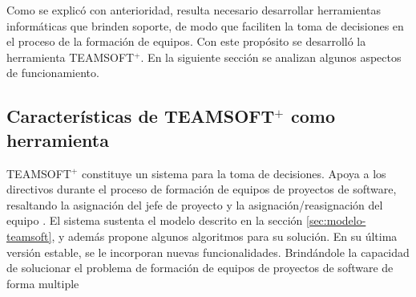 Como se explicó con anterioridad, resulta necesario desarrollar herramientas informáticas que brinden soporte, de modo que faciliten la toma de decisiones en el proceso de la formación de equipos. Con este propósito se desarrolló la herramienta TEAMSOFT$^+$. En la siguiente sección se analizan algunos aspectos de funcionamiento.

\subsection{Características de TEAMSOFT$^+$ como herramienta}

TEAMSOFT$^+$ constituye un sistema para la toma de decisiones. Apoya a los directivos durante el proceso de formación de equipos de proyectos de software, resaltando la asignación del jefe de proyecto y la asignación/reasignación del equipo \citep{Mayi09}. El sistema sustenta el modelo descrito en la sección \ref{sec:modelo-teamsoft}, y además propone algunos algoritmos para su solución. En su última versión estable, se le incorporan nuevas funcionalidades. Brindándole la capacidad de solucionar el problema de formación de equipos de proyectos de software de forma multiple

